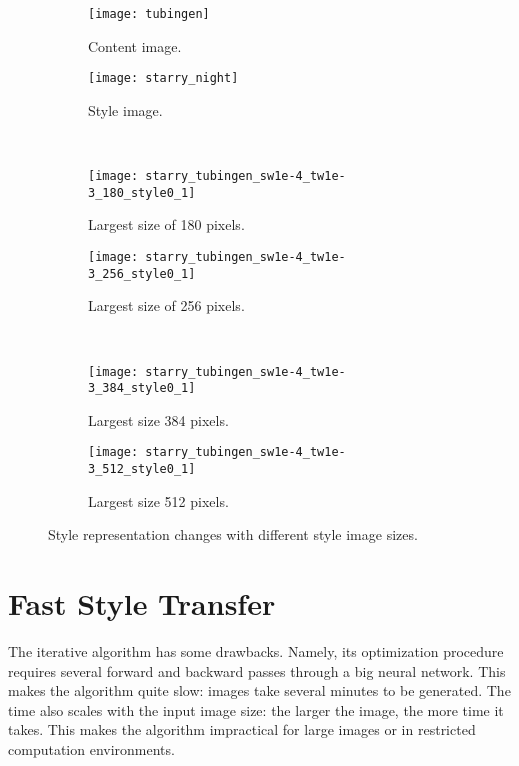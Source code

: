\begin{figure}
	\centering
	\begin{subfigure}[t]{0.45\textwidth}
		\texttt{[image: tubingen]}
		\caption{Content image.}
	\end{subfigure}
	\begin{subfigure}[t]{0.45\textwidth}
		\texttt{[image: starry\_night]}
		\caption{Style image.}
	\end{subfigure}\\
	\begin{subfigure}[t]{0.45\textwidth}
		\texttt{[image: starry\_tubingen\_sw1e-4\_tw1e-3\_180\_style0\_1]}
		\caption{Largest size of 180 pixels.}
	\end{subfigure}
	\begin{subfigure}[t]{0.45\textwidth}
		\texttt{[image: starry\_tubingen\_sw1e-4\_tw1e-3\_256\_style0\_1]}
		\caption{Largest size of 256 pixels.}		
	\end{subfigure}\\
	\begin{subfigure}[t]{0.45\textwidth}
		\texttt{[image: starry\_tubingen\_sw1e-4\_tw1e-3\_384\_style0\_1]}
		\caption{Largest size 384 pixels.}
	\end{subfigure}
	\begin{subfigure}[t]{0.45\textwidth}
		\texttt{[image: starry\_tubingen\_sw1e-4\_tw1e-3\_512\_style0\_1]}
		\caption{Largest size 512 pixels.}
	\end{subfigure}
	\caption{Style representation changes with different style image sizes.\label{ref:style-imsizes}}
\end{figure}


\section{Fast Style Transfer}\label{sec:fast-style}
The iterative algorithm has some drawbacks. Namely, its optimization procedure requires several forward and backward passes through a big neural network. This makes the algorithm quite slow: images take several minutes to be generated. The time also scales with the input image size: the larger the image, the more time it takes. This makes the algorithm impractical for large images or in restricted computation environments.

